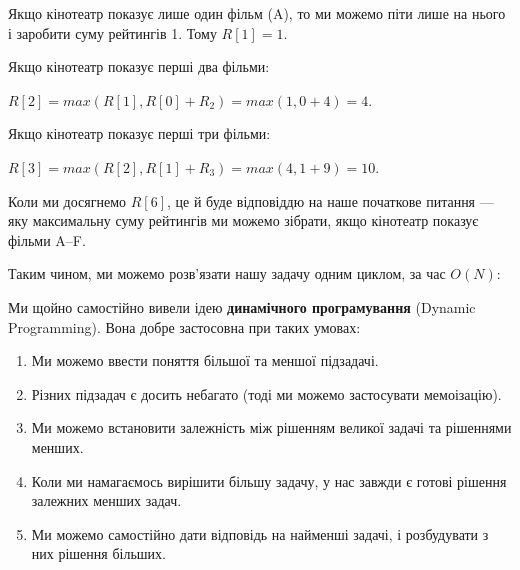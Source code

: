 \documentclass[12pt,a4paper]{report}
\begin{document}
Якщо кінотеатр показує лише один фільм (A), то ми можемо піти лише на нього і заробити суму рейтингів 1. Тому \(R[1] = 1\).

Якщо кінотеатр показує перші два фільми:

\(R[2] = max(R[1], R[0] + R_2) = max(1, 0 + 4) = 4\).

Якщо кінотеатр показує перші три фільми:

\(R[3] = max(R[2], R[1] + R_3) = max(4, 1 + 9) = 10\).

Коли ми досягнемо \(R[6]\), це й буде відповіддю на наше початкове питання --- яку максимальну суму рейтингів ми можемо зібрати, якщо кінотеатр показує фільми A--F.

Таким чином, ми можемо розв’язати нашу задачу одним циклом, за час \(O(N)\):



Ми щойно самостійно вивели ідею \textbf{динамічного програмування} (Dynamic Programming). Вона добре застосовна при таких умовах:

\begin{enumerate}
    \item Ми можемо ввести поняття більшої та меншої підзадачі.
    \item Різних підзадач є досить небагато (тоді ми можемо застосувати мемоізацію).
    \item Ми можемо встановити залежність між рішенням великої задачі та рішеннями менших.
    \item Коли ми намагаємось вирішити більшу задачу, у нас завжди є готові рішення залежних менших задач.
    \item Ми можемо самостійно дати відповідь на найменші задачі, і розбудувати з них рішення більших.
\end{enumerate}
\end{document}
